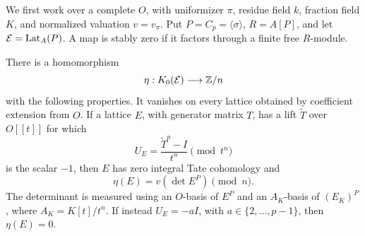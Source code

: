 We first work over a complete \(O\), with uniformizer \(\pi\),
residue field \(k\), fraction field \(K\), and normalized valuation
\(v=v_\pi\).  Put \(P=C_p=\langle\sigma\rangle\), \(R=A[P]\), and
let \(\mathcal E=\operatorname{Lat}_A(P)\).
A map is stably zero if it factors through a finite free
\(R\)-module.

\begin{lemma}\label{lem:vertical-primary-index}
There is a homomorphism
\[
 \eta:K_0(\mathcal E)\longrightarrow\mathbb Z/n
\]
with the following properties.
It vanishes on every lattice obtained by coefficient extension
from \(O\).  If a lattice \(E\), with generator matrix \(T\), has a
lift \(\widetilde T\) over \(O[[t]]\) for which
\[
 U_E=\frac{\widetilde T^p-I}{t^n}\pmod{t^n}
\]
is the scalar \(-1\), then \(E\) has zero integral Tate cohomology
and
\[
 \eta(E)=v(\det E^P)\pmod n.
\]
The determinant is measured using an \(O\)-basis of \(E^P\) and
an \(A_K\)-basis of \((E_K)^P\), where \(A_K=K[t]/t^n\).
If instead \(U_E=-aI\), with \(a\in\{2,\ldots,p-1\}\), then
\(\eta(E)=0\).
\end{lemma}

